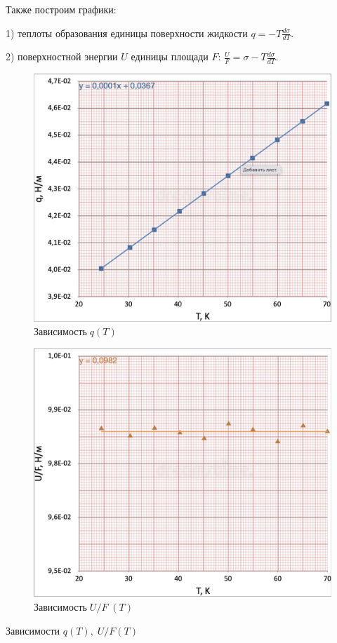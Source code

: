 \documentclass[12pt,a4paper]{article}
\begin{document}
		Также построим графики:
		
		1) теплоты образования единицы поверхности жидкости $q = - T \frac{d\sigma}{dT}$.
		
		2) поверхностной энергии $U$ единицы площади $F$: $\frac{U}{F} = \sigma - T \frac{d\sigma}{dT}$.
	
				
		\begin{figure}[H]
			\includegraphics[width = 10.5 cm]{src/q_t.pdf}
			\caption{$ \text{Зависимость} \; q(T)$}
		\end{figure}
		
		\begin{figure}[H]
			\includegraphics[width = 10.5 cm]{src/u_f_t.pdf}
			\caption{$ \text{Зависимость} \; U/F \;(T)$}
		\end{figure}
		
		\begin{table}[h]
			\caption{Зависимости $q(T), \; U/F(T)$}
			
		\end{table}
		
\end{document}
